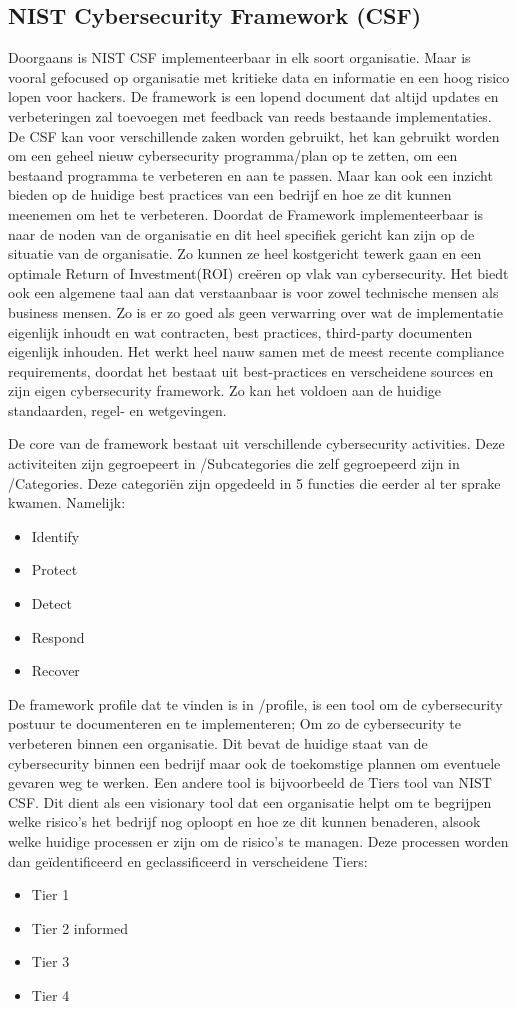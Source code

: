 \subsection{NIST Cybersecurity Framework (CSF)}

Doorgaans is NIST CSF implementeerbaar in elk soort organisatie. Maar is vooral gefocused op organisatie met kritieke data en informatie en een hoog risico lopen voor hackers.
De framework is een lopend document dat altijd updates en verbeteringen zal toevoegen met feedback van reeds bestaande implementaties. \autocite{Calder2018}
De CSF kan voor verschillende zaken worden gebruikt, het kan gebruikt worden om een geheel nieuw cybersecurity programma/plan op te zetten, om een bestaand programma te verbeteren en aan te passen. Maar kan ook een inzicht bieden op de huidige best practices van een bedrijf en hoe ze dit kunnen meenemen om het te verbeteren.
Doordat de Framework implementeerbaar is naar de noden van de organisatie en dit heel specifiek gericht kan zijn op de situatie van de organisatie. Zo kunnen ze heel kostgericht tewerk gaan en een optimale Return of Investment(ROI) creëren op vlak van cybersecurity.
Het biedt ook een algemene taal aan dat verstaanbaar is voor zowel technische mensen als business mensen. Zo is er zo goed als geen verwarring over wat de implementatie eigenlijk inhoudt en wat contracten, best practices, third-party documenten eigenlijk inhouden.
Het werkt heel nauw samen met de meest recente compliance requirements, doordat het bestaat uit best-practices en verscheidene sources en zijn eigen cybersecurity framework. Zo kan het voldoen aan de huidige standaarden, regel- en wetgevingen. \autocite{Calder2018}

De core van de framework bestaat uit verschillende cybersecurity activities. Deze activiteiten zijn gegroepeert in /Subcategories die zelf gegroepeerd zijn in /Categories. Deze categoriën zijn opgedeeld in 5 functies die eerder al ter sprake kwamen.
Namelijk:

\begin{itemize}
    \item Identify
    \item Protect
    \item Detect
    \item Respond
    \item Recover
\end{itemize}

De framework profile dat te vinden is in /profile, is een tool om de cybersecurity postuur te documenteren en te implementeren; Om zo de cybersecurity te verbeteren binnen een organisatie.
Dit bevat de huidige staat van de cybersecurity binnen een bedrijf maar ook de toekomstige plannen om eventuele gevaren weg te werken. \autocite{Sultan2017}
Een andere tool is bijvoorbeeld de Tiers tool van NIST CSF. Dit dient als een visionary tool dat een organisatie helpt om te begrijpen welke risico's het bedrijf nog oploopt en hoe ze dit kunnen benaderen, alsook welke huidige processen er zijn om de risico's te managen.
Deze processen worden dan geïdentificeerd en geclassificeerd in verscheidene Tiers: \autocite{Sultan2017}

\begin{itemize}
    \item Tier 1 \Partial
    \item Tier 2 \Risk informed
    \item Tier 3 \Repeatable
    \item Tier 4 \Adaptive
\end{itemize}